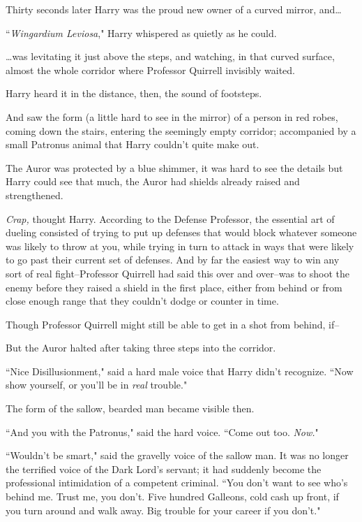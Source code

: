 Thirty seconds later Harry was the proud new owner of a curved mirror, and{\ldots}

``\emph{Wingardium Leviosa}," Harry whispered as quietly as he could.

{\ldots}was levitating it just above the steps, and watching, in that curved surface, almost the whole corridor where Professor Quirrell invisibly waited.

Harry heard it in the distance, then, the sound of footsteps.

And saw the form (a little hard to see in the mirror) of a person in red robes, coming down the stairs, entering the seemingly empty corridor; accompanied by a small Patronus animal that Harry couldn't quite make out.

The Auror was protected by a blue shimmer, it was hard to see the details but Harry could see that much, the Auror had shields already raised and strengthened.

\emph{Crap,} thought Harry. According to the Defense Professor, the essential art of dueling consisted of trying to put up defenses that would block whatever someone was likely to throw at you, while trying in turn to attack in ways that were likely to go past their current set of defenses. And by far the easiest way to win any sort of real fight\---Professor Quirrell had said this over and over\---was to shoot the enemy before they raised a shield in the first place, either from behind or from close enough range that they couldn't dodge or counter in time.

Though Professor Quirrell might still be able to get in a shot from behind, if\---

But the Auror halted after taking three steps into the corridor.

``Nice Disillusionment," said a hard male voice that Harry didn't recognize. ``Now show yourself, or you'll be in \emph{real} trouble."

The form of the sallow, bearded man became visible then.

``And you with the Patronus," said the hard voice. ``Come out too. \emph{Now.}"

``Wouldn't be smart," said the gravelly voice of the sallow man. It was no longer the terrified voice of the Dark Lord's servant; it had suddenly become the professional intimidation of a competent criminal. ``You don't want to see who's behind me. Trust me, you don't. Five hundred Galleons, cold cash up front, if you turn around and walk away. Big trouble for your career if you don't."

